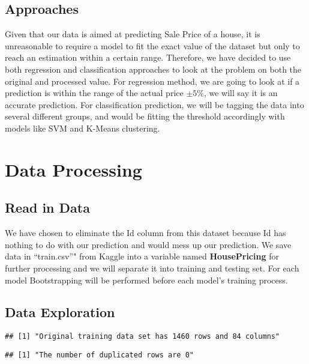 \documentclass[
]{article}
\begin{document}
\hypertarget{approaches}{%
\subsection{Approaches}\label{approaches}}

Given that our data is aimed at predicting Sale Price of a house, it is
unreasonable to require a model to fit the exact value of the dataset
but only to reach an estimation within a certain range. Therefore, we
have decided to use both regression and classification approaches to
look at the problem on both the original and processed value. For
regression method, we are going to look at if a prediction is within the
range of the actual price \(\pm 5\%\), we will say it is an accurate
prediction. For classification prediction, we will be tagging the data
into several different groups, and would be fitting the threshold
accordingly with models like SVM and K-Means clustering.

\hypertarget{data-processing}{%
\section{Data Processing}\label{data-processing}}

\hypertarget{read-in-data}{%
\subsection{Read in Data}\label{read-in-data}}

We have chosen to eliminate the Id column from this dataset because Id
has nothing to do with our prediction and would mess up our prediction.
We save data in ``train.csv''" from Kaggle into a variable named
\textbf{HousePricing} for further processing and we will separate it
into training and testing set. For each model Bootstrapping will be
performed before each model's training process.

\hypertarget{data-exploration}{%
\subsection{Data Exploration}\label{data-exploration}}

\begin{verbatim}
## [1] "Original training data set has 1460 rows and 84 columns"
\end{verbatim}

\begin{verbatim}
## [1] "The number of duplicated rows are 0"
\end{verbatim}
\end{document}
